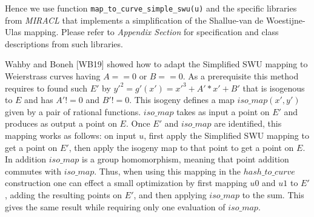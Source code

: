 Hence  we use function \lstinline|map_to_curve_simple_swu(u)| and  the specific libraries from \textit{MIRACL} that implements a simplification of the Shallue-van de Woestijne-Ulas mapping. 
Please refer to \textit{ Appendix Section } for specification and class descriptions from such libraries.

Wahby and Boneh [WB19] showed how to adapt the Simplified SWU mapping to Weierstrass curves having $A == 0$ or $B == 0$. As a prerequisite this method requires to found such $E'$ by $ y'^2 = g'(x') = x'^3 + A' * x' + B'$ that is isogenous to $E$ and has $ A' != 0 $ and $B' != 0$. This isogeny defines a map $iso\_map(x', y')$ given by a pair of rational functions. $iso\_map$ takes as input a point on $E'$ and produces as output a point on $E$. Once $E'$ and $iso\_map$ are identified, this mapping works as follows: on input $u$, first apply the Simplified SWU mapping to get a point on $E'$, then apply the isogeny map to that point to get a point on $E$. In addition $iso\_map$ is a group homomorphism, meaning that point addition commutes with $iso\_map$. Thus, when using this mapping in the $hash\_to\_curve$ construction one can effect a small optimization by first mapping $u0$ and $u1$ to $E'$, adding the resulting points on $E'$, and then applying $iso\_map$ to the sum. This gives the same result while requiring only one evaluation of $iso\_map$.\cite{ecc.hashing}

